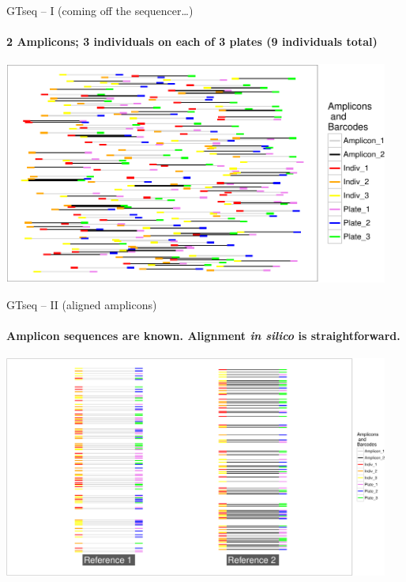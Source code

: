 \documentclass[letter,graphicx]{beamer}
\begin{document}
\begin{frame}{GTseq -- I {\small (coming off the sequencer\ldots)}}
\framesubtitle{2 Amplicons; 3 individuals on each of 3 plates (9 individuals total)}
\begin{center}
\includegraphics[width=0.95\textwidth]{figs/gtseq-soup-crop.pdf}
\end{center}
\end{frame}





\begin{frame}{GTseq -- II (aligned amplicons)}
\framesubtitle{Amplicon sequences are known. Alignment {\em in silico} is straightforward.}
\begin{center}
\includegraphics[width=0.95\textwidth]{figs/gtseq-amps-crop.pdf}
\end{center}
\end{frame}
\end{document}
